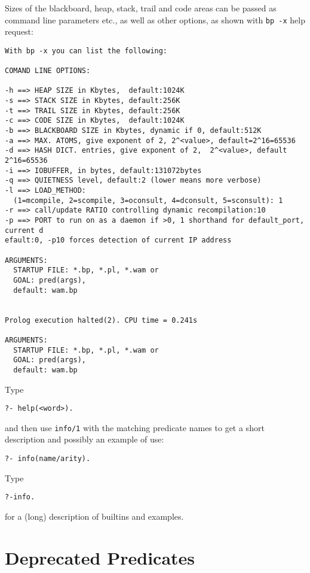 \documentclass{article}
\begin{document}
Sizes of the blackboard, heap, stack, trail and code areas can be passed as
command line parameters etc., as well as other options, as shown
with {\tt bp -x} help request:

\begin{verbatim}
With bp -x you can list the following:

COMAND LINE OPTIONS:

-h ==> HEAP SIZE in Kbytes,  default:1024K
-s ==> STACK SIZE in Kbytes, default:256K
-t ==> TRAIL SIZE in Kbytes, default:256K
-c ==> CODE SIZE in Kbytes,  default:1024K
-b ==> BLACKBOARD SIZE in Kbytes, dynamic if 0, default:512K
-a ==> MAX. ATOMS, give exponent of 2, 2^<value>, default=2^16=65536
-d ==> HASH DICT. entries, give exponent of 2,  2^<value>, default 2^16=65536
-i ==> IOBUFFER, in bytes, default:131072bytes
-q ==> QUIETNESS level, default:2 (lower means more verbose)
-l ==> LOAD_METHOD:
  (1=mcompile, 2=scompile, 3=oconsult, 4=dconsult, 5=sconsult): 1
-r ==> call/update RATIO controlling dynamic recompilation:10
-p ==> PORT to run on as a daemon if >0, 1 shorthand for default_port, current d
efault:0, -p10 forces detection of current IP address

ARGUMENTS:
  STARTUP FILE: *.bp, *.pl, *.wam or
  GOAL: pred(args),
  default: wam.bp


Prolog execution halted(2). CPU time = 0.241s

ARGUMENTS:
  STARTUP FILE: *.bp, *.pl, *.wam or
  GOAL: pred(args),
  default: wam.bp
\end{verbatim}

{\flushleft Type}

\begin{verbatim}
?- help(<word>).
\end{verbatim}

{\flushleft and} then use {\tt info/1} with the matching predicate names
to get a short description and possibly an example of use:

\begin{verbatim}
?- info(name/arity).
\end{verbatim}

{\flushleft Type}

\begin{verbatim}
?-info.
\end{verbatim}

{\flushleft for} a (long) description of builtins and examples.

\section{Deprecated Predicates}
\end{document}
